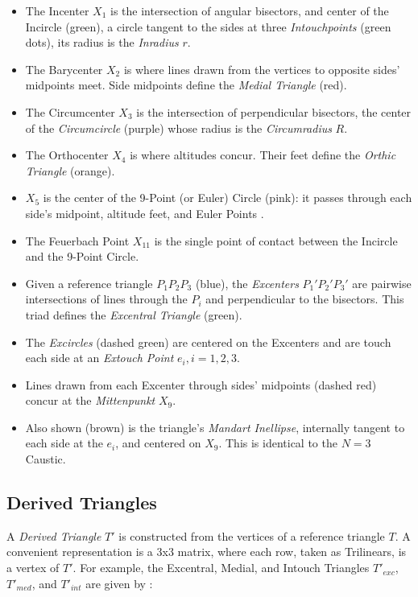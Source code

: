 \begin{itemize}
    \item The Incenter $X_1$ is the intersection of angular bisectors, and center of the Incircle (green), a circle tangent to the sides at three {\em Intouchpoints} (green dots), its radius is the {\em Inradius} $r$.
    \item The Barycenter $X_2$ is where lines drawn from the vertices to opposite sides' midpoints meet. Side midpoints define the {\em Medial Triangle} (red).
    \item The Circumcenter $X_3$ is the intersection of perpendicular bisectors, the center of the {\em Circumcircle} (purple) whose radius is the {\em Circumradius} $R$.
    \item The Orthocenter $X_4$ is where altitudes concur. Their feet define the {\em Orthic Triangle} (orange).
    \item $X_5$ is the center of the 9-Point (or Euler) Circle (pink): it passes through each side's midpoint, altitude feet, and Euler Points \cite{mw}.
    \item The Feuerbach Point $X_{11}$ is the single point of contact between the Incircle and the 9-Point Circle.
    \item Given a reference triangle $P_1P_2P_3$ (blue), the {\em Excenters} $P_1'P_2'P_3'$ are pairwise intersections of lines through the $P_i$ and perpendicular to the bisectors. This triad defines the {\em Excentral Triangle} (green).\
    \item The {\em Excircles} (dashed green) are centered on the Excenters and are touch each side at an {\em Extouch Point} $e_i,i=1,2,3$.
    \item Lines drawn from each Excenter through sides' midpoints (dashed red) concur at the {\em Mittenpunkt} $X_9$.
    \item Also shown (brown) is the triangle's {\em Mandart Inellipse}, internally tangent to each side at the $e_i$, and centered on $X_9$. This is identical to the $N=3$ Caustic.
\end{itemize}

\subsection{Derived Triangles}
\label{app:derived-tris}

A {\em Derived Triangle} $T'$ is constructed from the vertices of  a reference triangle $T$. A convenient representation is a 3x3 matrix, where each row, taken as Trilinears, is a vertex of $T'$. For example, the Excentral, Medial, and Intouch Triangles $T'_{exc}$, $T'_{med}$, and $T'_{int}$  are given by \cite{mw}: 

